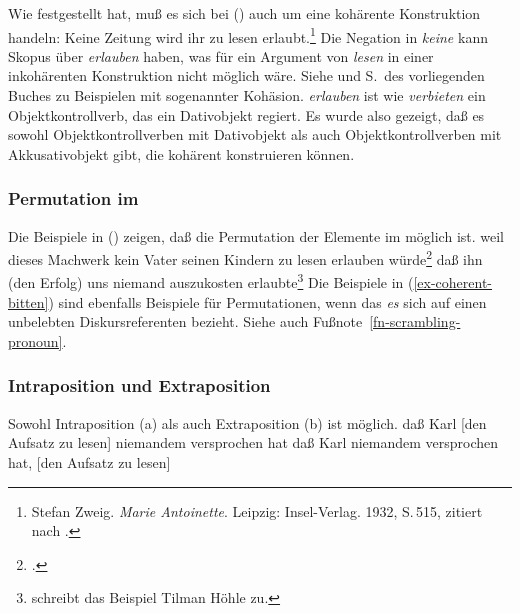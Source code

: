 Wie \citet[]{Askedal88} festgestellt hat, muß es sich bei ()
auch um eine kohärente Konstruktion handeln:
%
%
\ea
Keine Zeitung         wird ihr       zu lesen erlaubt.\footnote{
        Stefan Zweig. \emph{Marie Antoinette}. Leipzig: Insel-Verlag. 1932, S.\,515, 
        zitiert nach .
}
\z
Die Negation in \emph{keine} kann Skopus über \emph{erlauben} haben,
was für ein Argument von \emph{lesen} in einer inkohärenten Konstruktion nicht möglich wäre.
Siehe  und S.\,\pageref{bsp-trauen-kohaerent} des vorliegenden
Buches zu Beispielen mit sogenannter Kohäsion. \emph{erlauben} ist wie \emph{verbieten}
ein Objektkontrollverb, das ein Dativobjekt regiert. Es wurde also gezeigt, daß es sowohl
Objektkontrollverben mit Dativobjekt als auch Objektkontrollverben mit Akkusativobjekt gibt, die
kohärent konstruieren können.


\subsubsection{Permutation im \mf}
\label{sec-obj-contr-perm-mf}

Die Beispiele in () zeigen, daß die Permutation der Elemente im \mf möglich ist.
\eal
\ex{}
weil     dieses Machwerk        kein Vater      seinen Kindern     zu lesen erlauben würde\footnote{
        .
}
\ex 
daß ihn       (den Erfolg) uns      niemand      auszukosten erlaubte\footnote{
        \citet*[]{Haider91} schreibt das Beispiel Tilman Höhle zu.
}
\zl
Die Beispiele in (\ref{ex-coherent-bitten}) sind ebenfalls Beispiele für Permutationen,
wenn das \emph{es} sich auf einen unbelebten Diskursreferenten bezieht. Siehe auch
Fußnote~\ref{fn-scrambling-pronoun}.


\subsubsection{Intraposition und Extraposition}
\label{sec-obj-contr-ie}

Sowohl Intraposition (a) als auch Extraposition (b) ist möglich.
\eal
\ex 
daß Karl [den Aufsatz zu lesen] niemandem versprochen hat
\ex
daß Karl niemandem versprochen hat, [den Aufsatz zu lesen]
\zl
{}


